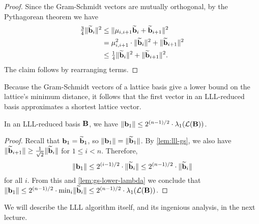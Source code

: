 \documentclass[11pt]{article}
\begin{document}
\begin{proof}
  Since the Gram-Schmidt vectors are mutually orthogonal, by the
  Pythagorean theorem we have
  \begin{align*}
    \tfrac34 \lVert\widetilde{\mathbf{b}}_i\rVert^2
    &\leq \lVert\mu_{i,i+1}\widetilde{\mathbf{b}}_i + \widetilde{\mathbf{b}}_{i+1}\rVert^2 \\
    &= \mu_{i,i+1}^2\cdot \lVert\widetilde{\mathbf{b}}_i\rVert^2 + \lVert\widetilde{\mathbf{b}}_{i+1}\rVert^2 \\
    &\leq \tfrac14 \lVert\widetilde{\mathbf{b}}_i\rVert^2 +
      \lVert\widetilde{\mathbf{b}}_{i+1}\rVert^2.
  \end{align*}
  The claim follows by rearranging terms.
\end{proof}

Because the Gram-Schmidt vectors of a lattice basis give a lower bound
on the lattice's minimum distance, it follows that the first vector in
an LLL-reduced basis approximates a shortest lattice vector.

\begin{corollary}
  \label{cor:lll-lambda}
  In an LLL-reduced basis $\mathbf{B}$, we have
  $\lVert\mathbf{b}_1\rVert \leq 2^{(n-1)/2} \cdot \lambda_{1}(\mathcal{L}(\mathbf{B}))$.
\end{corollary}

\begin{proof}
  Recall that $\mathbf{b}_1 = \widetilde{\mathbf{b}}_1$, so
  $\lVert \mathbf{b}_1\rVert = \lVert\widetilde{\mathbf{b}}_1\rVert$. By \cref{lem:lll-gs},
  we also have
  $\lVert\widetilde{\mathbf{b}}_{i+1}\rVert \geq \frac{1}{\sqrt{2}} \lVert
    \widetilde{\mathbf{b}}_i\rVert$ for $1 \leq i < n$. Therefore,
  \[ \lVert\mathbf{b}_1\rVert \leq 2^{(i-1)/2}\cdot \lVert\widetilde{\mathbf{b}}_i\rVert \leq
    2^{(n-1)/2} \cdot \lVert\widetilde{\mathbf{b}}_{i}\rVert \] for all $i$. From
  this and \cref{lem:gs-lower-lambda} we conclude that
  $\lVert\mathbf{b}_1\rVert \leq 2^{(n-1)/2} \cdot \min_i
  \lVert\widetilde{\mathbf{b}}_i\rVert \leq 2^{(n-1)/2} \cdot
  \lambda_1(\mathcal{L}(\mathbf{B}))$.
\end{proof}

\noindent We will describe the LLL algorithm itself, and its ingenious
analysis, in the next lecture.
\end{document}
